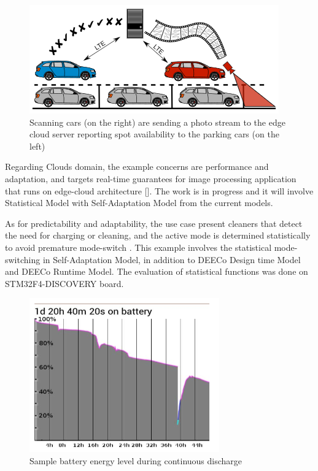 \begin{figure}[!htb]
\centering
\includegraphics[scale=0.65]{figures/parking}
\caption{Scanning cars (on the right) are sending a photo stream to the edge cloud server reporting spot availability to the parking cars (on the left)}
\label{fig:parking}
\end{figure}
 
Regarding Clouds domain, the example concerns are performance and adaptation, and targets real-time guarantees for image processing application that runs on edge-cloud architecture [\cite{Hnetynka:2018:GLA:3241403.3241448}]. The work is in progress and it will involve Statistical Model with Self-Adaptation Model from the current models. 

As for predictability and adaptability, the use case present cleaners that detect the need for charging or cleaning, and the active mode is determined statistically to avoid premature mode-switch \cite{bures2016stat}. This example involves the statistical mode-switching in Self-Adaptation Model, in addition to DEECo Design time Model and DEECo Runtime Model. The evaluation of statistical functions was done on STM32F4-DISCOVERY board. 
 
 \begin{figure}[!htb]
\centering
\includegraphics[scale=0.65]{figures/statistical}
\caption{Sample battery energy level during continuous discharge }
\label{fig:statistical}
\end{figure}

